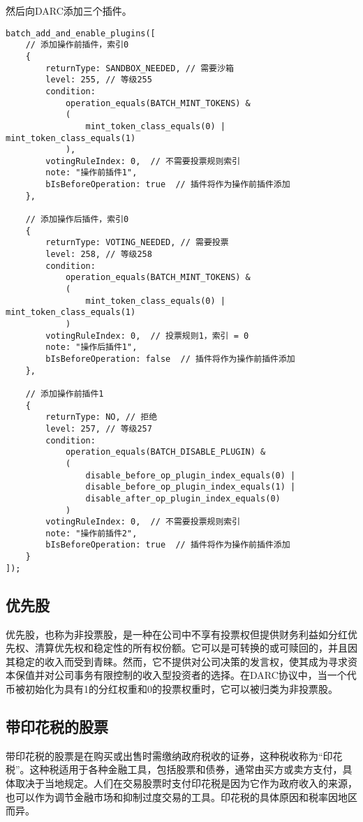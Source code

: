 \documentclass[main.tex]{subfiles}
\begin{document}
然后向DARC添加三个插件。
\begin{verbatim}
batch_add_and_enable_plugins([
    // 添加操作前插件，索引0
    {
        returnType: SANDBOX_NEEDED, // 需要沙箱
        level: 255, // 等级255
        condition:
            operation_equals(BATCH_MINT_TOKENS) & 
            ( 
                mint_token_class_equals(0) | mint_token_class_equals(1)
            ),
        votingRuleIndex: 0,  // 不需要投票规则索引
        note: "操作前插件1",
        bIsBeforeOperation: true  // 插件将作为操作前插件添加
    },

    // 添加操作后插件，索引0
    {
        returnType: VOTING_NEEDED, // 需要投票
        level: 258, // 等级258
        condition:
            operation_equals(BATCH_MINT_TOKENS) & 
            ( 
                mint_token_class_equals(0) | mint_token_class_equals(1)
            )
        votingRuleIndex: 0,  // 投票规则1，索引 = 0
        note: "操作后插件1",
        bIsBeforeOperation: false  // 插件将作为操作前插件添加
    },

    // 添加操作前插件1
    {
        returnType: NO, // 拒绝
        level: 257, // 等级257
        condition:
            operation_equals(BATCH_DISABLE_PLUGIN) & 
            ( 
                disable_before_op_plugin_index_equals(0) | 
                disable_before_op_plugin_index_equals(1) |
                disable_after_op_plugin_index_equals(0)
            )
        votingRuleIndex: 0,  // 不需要投票规则索引
        note: "操作前插件2",
        bIsBeforeOperation: true  // 插件将作为操作前插件添加
    }
]);
\end{verbatim}

\subsection{优先股}

优先股，也称为非投票股，是一种在公司中不享有投票权但提供财务利益如分红优先权、清算优先权和稳定性的所有权份额。它可以是可转换的或可赎回的，并且因其稳定的收入而受到青睐。然而，它不提供对公司决策的发言权，使其成为寻求资本保值并对公司事务有限控制的收入型投资者的选择。在DARC协议中，当一个代币被初始化为具有1的分红权重和0的投票权重时，它可以被归类为非投票股。

\subsection{带印花税的股票}

带印花税的股票是在购买或出售时需缴纳政府税收的证券，这种税收称为“印花税”。这种税适用于各种金融工具，包括股票和债券，通常由买方或卖方支付，具体取决于当地规定。人们在交易股票时支付印花税是因为它作为政府收入的来源，也可以作为调节金融市场和抑制过度交易的工具。印花税的具体原因和税率因地区而异。
\end{document}
